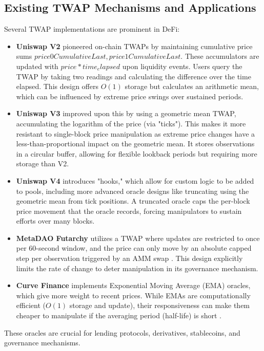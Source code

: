 \documentclass{article}
\begin{document}
\subsection{Existing TWAP Mechanisms and Applications}
Several TWAP implementations are prominent in DeFi:
\begin{itemize}
    \item \textbf{Uniswap V2} pioneered on-chain TWAPs by maintaining cumulative price sums $price0CumulativeLast, price1CumulativeLast$. These accumulators are updated with $price * time_elapsed$ upon liquidity events. Users query the TWAP by taking two readings and calculating the difference over the time elapsed. This design offers $O(1)$ storage but calculates an arithmetic mean, which can be influenced by extreme price swings over sustained periods.
    \item \textbf{Uniswap V3} improved upon this by using a geometric mean TWAP, accumulating the logarithm of the price (via "ticks"). This makes it more resistant to single-block price manipulation as extreme price changes have a less-than-proportional impact on the geometric mean. It stores observations in a circular buffer, allowing for flexible lookback periods but requiring more storage than V2.
    \item \textbf{Uniswap V4} introduces "hooks," which allow for custom logic to be added to pools, including more advanced oracle designs like truncating using the geometric mean from tick positions. A truncated oracle caps the per-block price movement that the oracle records, forcing manipulators to sustain efforts over many blocks.
    \item \textbf{MetaDAO Futarchy} utilizes a TWAP where updates are restricted to once per 60-second window, and the price can only move by an absolute capped step per observation triggered by an AMM swap \cite{ammrs}. This design explicitly limits the rate of change to deter manipulation in its governance mechanism.
    \item \textbf{Curve Finance} implements Exponential Moving Average (EMA) oracles, which give more weight to recent prices. While EMAs are computationally efficient ($O(1)$ storage and update), their responsiveness can make them cheaper to manipulate if the averaging period (half-life) is short \cite{curve_ema_blog}.
\end{itemize}
These oracles are crucial for lending protocols, derivatives, stablecoins, and governance mechanisms.
\end{document}
